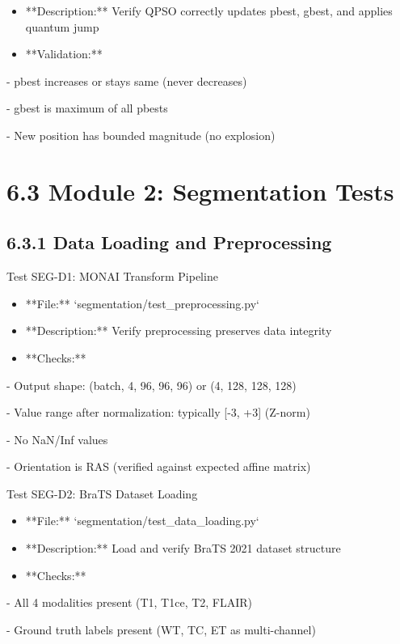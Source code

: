 \begin{itemize}
  \item **Description:** Verify QPSO correctly updates pbest, gbest, and applies quantum jump
  \item **Validation:**
\end{itemize}

- pbest increases or stays same (never decreases)

- gbest is maximum of all pbests

- New position has bounded magnitude (no explosion)


\section{6.3 Module 2: Segmentation Tests}

\subsection{6.3.1 Data Loading and Preprocessing}
Test SEG-D1: MONAI Transform Pipeline

\begin{itemize}
  \item **File:** `segmentation/test\_preprocessing.py`
  \item **Description:** Verify preprocessing preserves data integrity
  \item **Checks:**
\end{itemize}

- Output shape: (batch, 4, 96, 96, 96) or (4, 128, 128, 128)

- Value range after normalization: typically [-3, +3] (Z-norm)

- No NaN/Inf values

- Orientation is RAS (verified against expected affine matrix)

Test SEG-D2: BraTS Dataset Loading

\begin{itemize}
  \item **File:** `segmentation/test\_data\_loading.py`
  \item **Description:** Load and verify BraTS 2021 dataset structure
  \item **Checks:**
\end{itemize}

- All 4 modalities present (T1, T1ce, T2, FLAIR)

- Ground truth labels present (WT, TC, ET as multi-channel)

